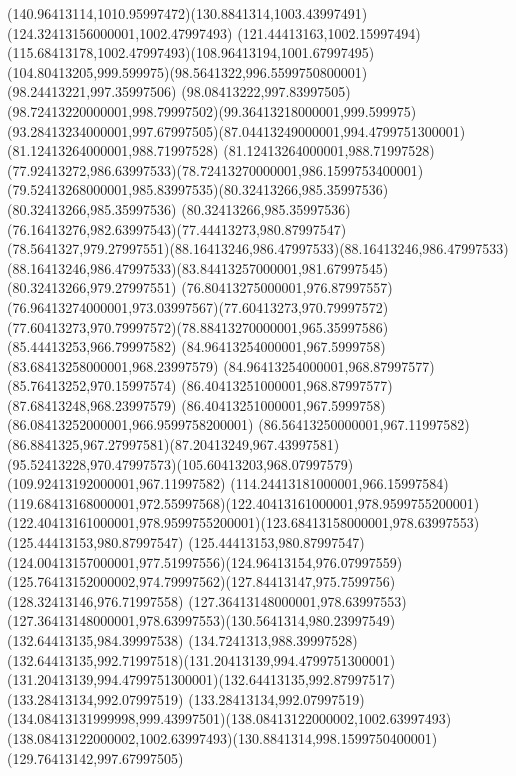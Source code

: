 {{	\curveto(140.96413114,1010.95997472)(130.8841314,1003.43997491)(124.32413156000001,1002.47997493)
	\curveto(121.44413163,1002.15997494)(115.68413178,1002.47997493)(108.96413194,1001.67997495)
	\curveto(104.80413205,999.599975)(98.5641322,996.5599750800001)(98.24413221,997.35997506)
	\curveto(98.08413222,997.83997505)(98.72413220000001,998.79997502)(99.36413218000001,999.599975)
	\curveto(93.28413234000001,997.67997505)(87.04413249000001,994.4799751300001)(81.12413264000001,988.71997528)
	\curveto(81.12413264000001,988.71997528)(77.92413272,986.63997533)(78.72413270000001,986.1599753400001)
	\curveto(79.52413268000001,985.83997535)(80.32413266,985.35997536)(80.32413266,985.35997536)
	\curveto(80.32413266,985.35997536)(76.16413276,982.63997543)(77.44413273,980.87997547)
	\curveto(78.5641327,979.27997551)(88.16413246,986.47997533)(88.16413246,986.47997533)
	\curveto(88.16413246,986.47997533)(83.84413257000001,981.67997545)(80.32413266,979.27997551)
	\curveto(76.80413275000001,976.87997557)(76.96413274000001,973.03997567)(77.60413273,970.79997572)
	\curveto(77.60413273,970.79997572)(78.88413270000001,965.35997586)(85.44413253,966.79997582)
	\lineto(84.96413254000001,967.5999758)
	\lineto(83.68413258000001,968.23997579)
	\lineto(84.96413254000001,968.87997577)
	\lineto(85.76413252,970.15997574)
	\lineto(86.40413251000001,968.87997577)
	\lineto(87.68413248,968.23997579)
	\lineto(86.40413251000001,967.5999758)
	\lineto(86.08413252000001,966.9599758200001)
	\curveto(86.56413250000001,967.11997582)(86.8841325,967.27997581)(87.20413249,967.43997581)
	\curveto(95.52413228,970.47997573)(105.60413203,968.07997579)(109.92413192000001,967.11997582)
	\curveto(114.24413181000001,966.15997584)(119.68413168000001,972.55997568)(122.40413161000001,978.9599755200001)
	\curveto(122.40413161000001,978.9599755200001)(123.68413158000001,978.63997553)(125.44413153,980.87997547)
	\curveto(125.44413153,980.87997547)(124.00413157000001,977.51997556)(124.96413154,976.07997559)
	\curveto(125.76413152000002,974.79997562)(127.84413147,975.7599756)(128.32413146,976.71997558)
	\lineto(127.36413148000001,978.63997553)
	\curveto(127.36413148000001,978.63997553)(130.5641314,980.23997549)(132.64413135,984.39997538)
	\curveto(134.7241313,988.39997528)(132.64413135,992.71997518)(131.20413139,994.4799751300001)
	\curveto(131.20413139,994.4799751300001)(132.64413135,992.87997517)(133.28413134,992.07997519)
	\curveto(133.28413134,992.07997519)(134.08413131999998,999.43997501)(138.08413122000002,1002.63997493)
	\curveto(138.08413122000002,1002.63997493)(130.8841314,998.1599750400001)(129.76413142,997.67997505)
}}
